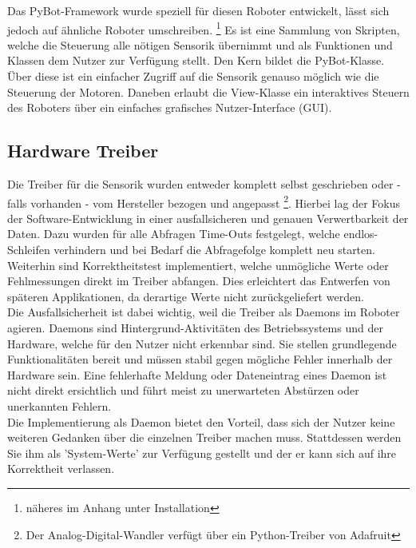 \documentclass[twoside,12pt,a4paper]{report}
\begin{document}
	Das PyBot-Framework wurde speziell für diesen Roboter entwickelt, lässt sich jedoch auf ähnliche Roboter umschreiben. \footnote{näheres im Anhang unter Installation}
	Es ist eine Sammlung von Skripten, welche die Steuerung alle nötigen Sensorik übernimmt und als Funktionen und Klassen dem Nutzer zur Verfügung stellt. Den Kern bildet die PyBot-Klasse. Über diese ist ein einfacher Zugriff auf die Sensorik genauso möglich wie die Steuerung der Motoren. Daneben erlaubt die View-Klasse ein interaktives Steuern des Roboters über ein einfaches grafisches Nutzer-Interface (GUI). 
	\FloatBarrier
	\subsection{Hardware Treiber}
	Die Treiber für die Sensorik wurden entweder komplett selbst geschrieben oder - falls vorhanden - vom Hersteller bezogen und angepasst \footnote{Der Analog-Digital-Wandler verfügt über ein Python-Treiber von Adafruit}. Hierbei lag der Fokus der Software-Entwicklung in einer ausfallsicheren und genauen Verwertbarkeit der Daten. Dazu wurden für alle Abfragen Time-Outs festgelegt, welche endlos-Schleifen verhindern und bei Bedarf die Abfragefolge komplett neu starten. Weiterhin sind Korrektheitstest implementiert, welche unmögliche Werte oder Fehlmessungen direkt im Treiber abfangen. Dies erleichtert das Entwerfen von späteren Applikationen, da derartige Werte nicht zurückgeliefert werden. \\
	Die Ausfallsicherheit ist dabei wichtig, weil die Treiber als Daemons im Roboter agieren. Daemons sind Hintergrund-Aktivitäten des Betriebssystems und der Hardware, welche für den Nutzer nicht erkennbar sind. Sie stellen grundlegende Funktionalitäten bereit und müssen stabil gegen mögliche Fehler innerhalb der Hardware sein. Eine fehlerhafte Meldung oder Dateneintrag eines Daemon ist nicht direkt ersichtlich und führt meist zu unerwarteten Abstürzen oder unerkannten Fehlern. \\
	Die Implementierung als Daemon bietet den Vorteil, dass sich der Nutzer keine weiteren Gedanken über die einzelnen Treiber machen muss. Stattdessen werden Sie ihm als 'System-Werte' zur Verfügung gestellt und der er kann sich auf ihre Korrektheit verlassen. 
	
	
\end{document}
